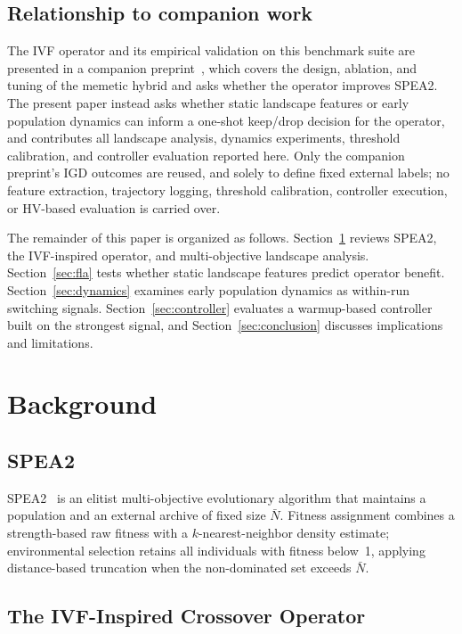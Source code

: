 \documentclass[conference]{IEEEtran}
\begin{document}
\subsection{Relationship to companion work}
The IVF operator and its empirical validation on this benchmark suite are
presented in a companion preprint~\cite{zambrano2026ivfspea2}, which covers the
design, ablation, and tuning of the memetic hybrid and asks whether the operator
improves SPEA2. The present paper instead asks whether static landscape features
or early population dynamics can inform a one-shot keep/drop decision for the
operator, and contributes all landscape analysis, dynamics experiments, threshold
calibration, and controller evaluation reported here. Only the companion
preprint's IGD outcomes are reused, and solely to define fixed external labels;
no feature extraction, trajectory logging, threshold calibration, controller
execution, or HV-based evaluation is carried over.

The remainder of this paper is organized as follows.
Section~\ref{sec:background} reviews SPEA2, the IVF-inspired operator, and
multi-objective landscape analysis. Section~\ref{sec:fla} tests whether static
landscape features predict operator benefit. Section~\ref{sec:dynamics} examines
early population dynamics as within-run switching signals.
Section~\ref{sec:controller} evaluates a warmup-based controller built on the
strongest signal, and Section~\ref{sec:conclusion} discusses implications and
limitations.

\section{Background}
\label{sec:background}

\subsection{SPEA2}
\label{sec:spea2}

SPEA2~\cite{zitzler2001spea2} is an elitist multi-objective evolutionary
algorithm that maintains a population and an external archive of fixed size
$\bar{N}$. Fitness assignment combines a strength-based raw fitness with a
$k$-nearest-neighbor density estimate; environmental selection retains all
individuals with fitness below~1, applying distance-based truncation when the
non-dominated set exceeds $\bar{N}$.

\subsection{The IVF-Inspired Crossover Operator}
\label{sec:ivf}
\end{document}
